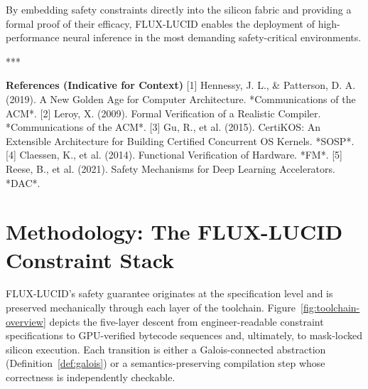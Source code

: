 \documentclass[conference]{IEEEtran}
\begin{document}
By embedding safety constraints directly into the silicon fabric and providing a formal proof of their efficacy, FLUX-LUCID enables the deployment of high-performance neural inference in the most demanding safety-critical environments.

***

\textbf{References (Indicative for Context)}
[1] Hennessy, J. L., & Patterson, D. A. (2019). A New Golden Age for Computer Architecture. *Communications of the ACM*.
[2] Leroy, X. (2009). Formal Verification of a Realistic Compiler. *Communications of the ACM*.
[3] Gu, R., et al. (2015). CertiKOS: An Extensible Architecture for Building Certified Concurrent OS Kernels. *SOSP*.
[4] Claessen, K., et al. (2014). Functional Verification of Hardware. *FM*.
[5] Reese, B., et al. (2021). Safety Mechanisms for Deep Learning Accelerators. *DAC*.


\section{Methodology: The FLUX-LUCID Constraint Stack}
\label{sec:methodology}

FLUX-LUCID's safety guarantee originates at the specification level and is
preserved mechanically through each layer of the toolchain.
Figure~\ref{fig:toolchain-overview} depicts the five-layer descent from
engineer-readable constraint specifications to GPU-verified bytecode
sequences and, ultimately, to mask-locked silicon execution.
Each transition is either a Galois-connected abstraction (Definition~\ref{def:galois})
or a semantics-preserving compilation step whose correctness is independently
checkable.
\end{document}
